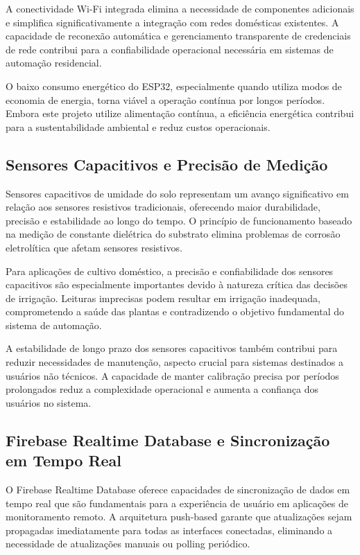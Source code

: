 \documentclass[twoside,english,brazilian]{UNISINOSmonografia}
\begin{document}
A conectividade Wi-Fi integrada elimina a necessidade de componentes adicionais e simplifica significativamente a integração com redes domésticas existentes. A capacidade de reconexão automática e gerenciamento transparente de credenciais de rede contribui para a confiabilidade operacional necessária em sistemas de automação residencial.

O baixo consumo energético do ESP32, especialmente quando utiliza modos de economia de energia, torna viável a operação contínua por longos períodos. Embora este projeto utilize alimentação contínua, a eficiência energética contribui para a sustentabilidade ambiental e reduz custos operacionais.

\subsection{Sensores Capacitivos e Precisão de Medição}

Sensores capacitivos de umidade do solo representam um avanço significativo em relação aos sensores resistivos tradicionais, oferecendo maior durabilidade, precisão e estabilidade ao longo do tempo. O princípio de funcionamento baseado na medição de constante dielétrica do substrato elimina problemas de corrosão eletrolítica que afetam sensores resistivos.

Para aplicações de cultivo doméstico, a precisão e confiabilidade dos sensores capacitivos são especialmente importantes devido à natureza crítica das decisões de irrigação. Leituras imprecisas podem resultar em irrigação inadequada, comprometendo a saúde das plantas e contradizendo o objetivo fundamental do sistema de automação.

A estabilidade de longo prazo dos sensores capacitivos também contribui para reduzir necessidades de manutenção, aspecto crucial para sistemas destinados a usuários não técnicos. A capacidade de manter calibração precisa por períodos prolongados reduz a complexidade operacional e aumenta a confiança dos usuários no sistema.

\subsection{Firebase Realtime Database e Sincronização em Tempo Real}

O Firebase Realtime Database oferece capacidades de sincronização de dados em tempo real que são fundamentais para a experiência de usuário em aplicações de monitoramento remoto. A arquitetura push-based garante que atualizações sejam propagadas imediatamente para todas as interfaces conectadas, eliminando a necessidade de atualizações manuais ou polling periódico.
\end{document}
